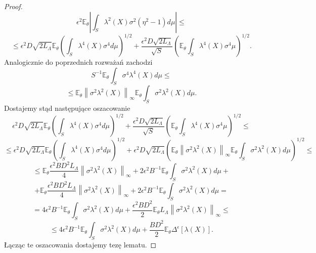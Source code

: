 \documentclass{article}
\newcommand{\norm}[1]{\left\lVert#1\right\rVert}
\begin{document}
\begin{proof}
\begin{displaymath}
\epsilon^2\mathbb{E}_{\theta}\left|\int_S\lambda^2(X)\sigma^2(\eta^2-1)d\mu\right|\leq
\end{displaymath}
\begin{displaymath}
\leq \epsilon^2D\sqrt{2L_{\Lambda}}\mathbb{E}_{\theta}\left(\int_S\lambda^4(X)\sigma^4d\mu\right)^{1/2}+\frac{\epsilon^2D\sqrt{2L_{\Lambda}}}{\sqrt{S}}\left(\mathbb{E}_{\theta}\int_S\lambda^4(X)\sigma^4\mu\right)^{1/2}.
\end{displaymath}
Analogicznie do poprzednich rozważań zachodzi
\begin{displaymath}
S^{-1}\mathbb{E}_{\theta}\int_S\sigma^4\lambda^4(X)d\mu\leq 
\end{displaymath}
\begin{displaymath}
\leq \mathbb{E}_{\theta}\norm{\sigma^2\lambda^2(X)}_{\infty}\mathbb{E}_{\theta}\int_S\sigma^2\lambda^2(X)d\mu.
\end{displaymath}
Dostajemy stąd następujące oszacowanie
\begin{displaymath}
\epsilon^2D\sqrt{2L_{\Lambda}}\mathbb{E}_{\theta}\left(\int_S\lambda^4(X)\sigma^4d\mu\right)^{1/2}+\frac{\epsilon^2D\sqrt{2L_{\Lambda}}}{\sqrt{S}}\left(\mathbb{E}_{\theta}\int_S\lambda^4(X)\sigma^4\mu\right)^{1/2} \leq
\end{displaymath}
\begin{displaymath}
\leq \epsilon^2D\sqrt{2L_{\Lambda}}\mathbb{E}_{\theta}\left(\int_S\lambda^4(X)\sigma^4d\mu\right)^{1/2}+\epsilon^2D\sqrt{2L_{\Lambda}}\left(\mathbb{E}_{\theta}\norm{\sigma^2\lambda^2(X)}_{\infty}\mathbb{E}_{\theta}\int_S\sigma^2\lambda^2(X)d\mu\right)^{1/2}\leq
\end{displaymath}
\begin{displaymath}
\leq \mathbb{E}_{\theta}\frac{\epsilon^2BD^2L_{\Lambda}}{4}\norm{\sigma^2\lambda^2(X)}_{\infty}+2\epsilon^2B^{-1}\mathbb{E}_{\theta}\int_S\sigma^2\lambda^2(X)d\mu+
\end{displaymath}
\begin{displaymath}
+\mathbb{E}_{\theta}\frac{\epsilon^2BD^2L_{\Lambda}}{4}\norm{\sigma^2\lambda^2(X)}_{\infty}+2\epsilon^2B^{-1}\mathbb{E}_{\theta}\int_S\sigma^2\lambda^2(X)d\mu=
\end{displaymath}
\begin{displaymath}
=4\epsilon^2B^{-1}\mathbb{E}_{\theta}\int_S\sigma^2\lambda^2(X)d\mu+\frac{\epsilon^2BD^2}{2}\mathbb{E}_{\theta}L_{\Lambda}\norm{\sigma^2\lambda^2(X)}_{\infty}\leq
\end{displaymath}
\begin{displaymath}
\leq 4\epsilon^2B^{-1}\mathbb{E}_{\theta}\int_S\sigma^2\lambda^2(X)d\mu+\frac{BD^2}{2}\mathbb{E}_{\theta}\Delta^{\epsilon}[\lambda(X)].
\end{displaymath}
Łącząc te oszacowania dostajemy tezę lematu.
\end{proof}
\end{document}
